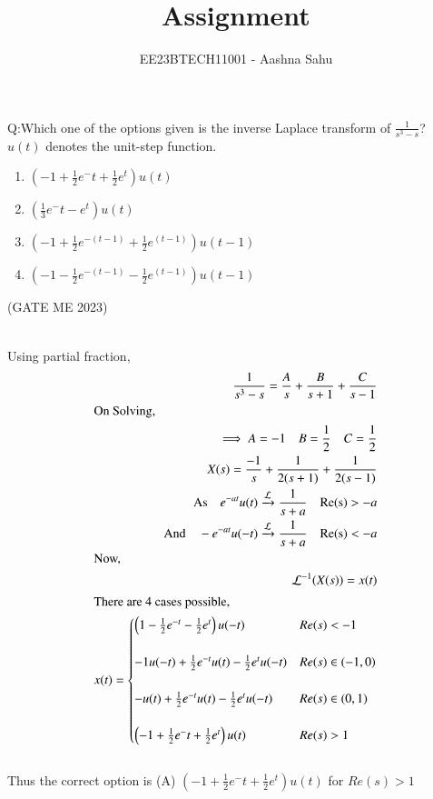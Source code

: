 \documentclass[journal,12pt,onecolumn]{IEEEtran}
\theoremstyle{remark}
\begin{document}
\let\vec\mathbf



\vspace{3cm}
\title{Assignment}
\author{EE23BTECH11001 - Aashna Sahu}
\maketitle
\bigskip

\renewcommand{\thefigure}{\theenumi}
\renewcommand{\thetable}{\theenumi}
Q:Which one of the options given is the inverse Laplace transform of $\frac{1}{s^3-s}$?\\
$u(t)$ denotes the unit-step function.
\begin{enumerate}[label=(\Alph*)]
\item $\left(-1+\frac{1}{2}e^-t+\frac{1}{2}e^t\right)u(t)$\\
\item $\left(\frac{1}{3}e^-t-e^t\right)u(t)$\\
\item $\left(-1+\frac{1}{2}e^{-(t-1)}+\frac{1}{2}e^{(t-1)}\right)u(t-1)$\\
\item $\left(-1-\frac{1}{2}e^{-(t-1)}-\frac{1}{2}e^{(t-1)}\right)u(t-1)$\\
\end{enumerate}
\hfill(GATE ME 2023)

\solution
\\
Using partial fraction,\\
\begin{align}
\frac{1}{s^3-s}=\frac{A}{s}+\frac{B}{s+1}+\frac{C}{s-1}\\
\intertext{On Solving,}
\implies A=-1\quad B=\frac{1}{2} \quad C=\frac{1}{2}\\
X(s)=\frac{-1}{s}+\frac{1}{2(s+1)}+\frac{1}{2(s-1)}\\
\text{As} \quad e^{-at}u(t) \xrightarrow{\mathcal{L}} \frac{1}{s+a}\quad \text{Re(s)}>-a\\
\text{And} \quad -e^{-at}u(-t) \xrightarrow{\mathcal{L}} \frac{1}{s+a}\quad \text{Re(s)}<-a\\
\intertext{Now,}
\mathcal{L}^{-1}(X(s))=x(t)\\
\intertext{There are 4 cases possible,}
x(t)=
\begin{cases}
        \left(1-\frac{1}{2}e^{-t}-\frac{1}{2}e^t\right)u(-t) & {Re(s)}<-1 \\
        \\
        -1u(-t)+\frac{1}{2}e^{-t}u(t)-\frac{1}{2}e^tu(-t) & {Re(s)}\in(-1,0)\\
        \\
        -u(t)+\frac{1}{2}e^{-t}u(t)-\frac{1}{2}e^tu(-t) & {Re(s)}\in(0,1)\\
        \\
        \left(-1+\frac{1}{2}e^-t+\frac{1}{2}e^t\right)u(t) & {Re(s)}>1
\end{cases}
\end{align}\\
 
Thus the correct option is (A) $\left(-1+\frac{1}{2}e^-t+\frac{1}{2}e^t\right)u(t)$ for ${Re(s)}>1$
\end{document}
